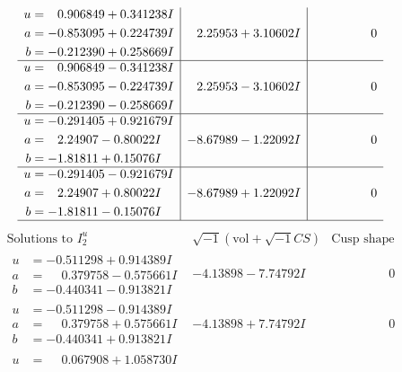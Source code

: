 \documentclass[1p]{elsarticle_modified}
\theoremstyle{definition}
\newcommand{\I}{\sqrt{-1}}
\begin{document}
$$\begin{array}{c|c|c}
\begin{aligned}
u &= \phantom{-}0.906849 + 0.341238 I \\
a &= -0.853095 + 0.224739 I \\
b &= -0.212390 + 0.258669 I\end{aligned}
 & \phantom{-}2.25953 + 3.10602 I & \phantom{-0.000000 } 0 \\ \hline\begin{aligned}
u &= \phantom{-}0.906849 - 0.341238 I \\
a &= -0.853095 - 0.224739 I \\
b &= -0.212390 - 0.258669 I\end{aligned}
 & \phantom{-}2.25953 - 3.10602 I & \phantom{-0.000000 } 0 \\ \hline\begin{aligned}
u &= -0.291405 + 0.921679 I \\
a &= \phantom{-}2.24907 - 0.80022 I \\
b &= -1.81811 + 0.15076 I\end{aligned}
 & -8.67989 - 1.22092 I & \phantom{-0.000000 } 0 \\ \hline\begin{aligned}
u &= -0.291405 - 0.921679 I \\
a &= \phantom{-}2.24907 + 0.80022 I \\
b &= -1.81811 - 0.15076 I\end{aligned}
 & -8.67989 + 1.22092 I & \phantom{-0.000000 } 0\\
 \hline 
 \end{array}$$\newpage$$\begin{array}{c|c|c}  
\text{Solutions to }I^u_{2}& \I (\text{vol} + \sqrt{-1}CS) & \text{Cusp shape}\\
 \hline 
\begin{aligned}
u &= -0.511298 + 0.914389 I \\
a &= \phantom{-}0.379758 - 0.575661 I \\
b &= -0.440341 - 0.913821 I\end{aligned}
 & -4.13898 - 7.74792 I & \phantom{-0.000000 } 0 \\ \hline\begin{aligned}
u &= -0.511298 - 0.914389 I \\
a &= \phantom{-}0.379758 + 0.575661 I \\
b &= -0.440341 + 0.913821 I\end{aligned}
 & -4.13898 + 7.74792 I & \phantom{-0.000000 } 0 \\ \hline\begin{aligned}
u &= \phantom{-}0.067908 + 1.058730 I \\

\end{aligned}
\end{array}$$
\end{document}
